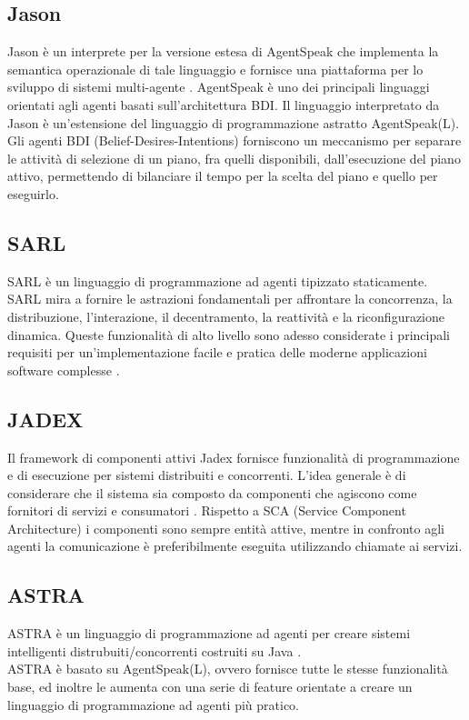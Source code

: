 \subsection*{Jason}
Jason è un interprete per la versione estesa di AgentSpeak che implementa la semantica operazionale di tale linguaggio e fornisce una piattaforma per lo sviluppo di sistemi multi-agente \cite{Jason}. AgentSpeak è uno dei principali linguaggi orientati agli agenti basati sull'architettura BDI. Il linguaggio interpretato da Jason è un'estensione del linguaggio di programmazione astratto AgentSpeak(L).
Gli agenti BDI (Belief-Desires-Intentions) forniscono un meccanismo per separare le attività di selezione di un piano, fra quelli disponibili, dall'esecuzione del piano attivo, permettendo di bilanciare il tempo per la scelta del piano e quello per eseguirlo.

\subsection*{SARL}
SARL è un linguaggio di programmazione ad agenti tipizzato staticamente. SARL mira a fornire le astrazioni fondamentali per affrontare la concorrenza, la distribuzione, l'interazione, il decentramento, la reattività e la riconfigurazione dinamica. Queste funzionalità di alto livello sono adesso considerate i principali requisiti per un'implementazione facile e pratica delle moderne applicazioni software complesse \cite{SARL}.

\subsection*{JADEX}
Il framework di componenti attivi Jadex fornisce funzionalità di programmazione e di esecuzione per sistemi distribuiti e concorrenti. L'idea generale è di considerare che il sistema sia composto da componenti che agiscono come fornitori di servizi e consumatori \cite{JADEX}.
Rispetto a SCA (Service Component Architecture) i componenti sono sempre entità attive, mentre in confronto agli agenti la comunicazione è preferibilmente eseguita utilizzando chiamate ai servizi.

\subsection*{ASTRA}
ASTRA è un linguaggio di programmazione ad agenti per creare sistemi intelligenti distrubuiti/concorrenti costruiti su Java \cite{Astra}.
\\
ASTRA è basato su AgentSpeak(L), ovvero fornisce tutte le stesse funzionalità base, ed inoltre le aumenta con una serie di feature orientate a creare un linguaggio di programmazione ad agenti più pratico.


